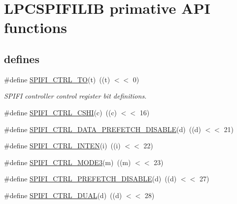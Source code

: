 \hypertarget{group___l_p_c_s_p_i_f_i_l_i_b___h_w___p_r_i_m}{}\section{L\+P\+C\+S\+P\+I\+F\+I\+L\+IB primative A\+PI functions}
\label{group___l_p_c_s_p_i_f_i_l_i_b___h_w___p_r_i_m}
\subsection*{\textquotesingle{}defines\textquotesingle{}}
\begin{DoxyCompactItemize}
\item 
\#define \hyperlink{group___l_p_c_s_p_i_f_i_l_i_b___h_w___p_r_i_m_ga96d43de9db048410b9d6d57de97a708d}{S\+P\+I\+F\+I\+\_\+\+C\+T\+R\+L\+\_\+\+TO}(t)~((t) $<$$<$ 0)
\begin{DoxyCompactList}\small\item\em S\+P\+I\+FI controller control register bit definitions. \end{DoxyCompactList}\item 
\#define \hyperlink{group___l_p_c_s_p_i_f_i_l_i_b___h_w___p_r_i_m_ga97562b0e2b41883d0f15e129f4b96cd7}{S\+P\+I\+F\+I\+\_\+\+C\+T\+R\+L\+\_\+\+C\+S\+HI}(c)~((c) $<$$<$ 16)
\item 
\#define \hyperlink{group___l_p_c_s_p_i_f_i_l_i_b___h_w___p_r_i_m_gaa87d14cdbb5575d56021c4fe68ec3d9f}{S\+P\+I\+F\+I\+\_\+\+C\+T\+R\+L\+\_\+\+D\+A\+T\+A\+\_\+\+P\+R\+E\+F\+E\+T\+C\+H\+\_\+\+D\+I\+S\+A\+B\+LE}(d)~((d) $<$$<$ 21)
\item 
\#define \hyperlink{group___l_p_c_s_p_i_f_i_l_i_b___h_w___p_r_i_m_ga3b934a3fc067d9b8676c6de1b4fe5f8f}{S\+P\+I\+F\+I\+\_\+\+C\+T\+R\+L\+\_\+\+I\+N\+T\+EN}(i)~((i) $<$$<$ 22)
\item 
\#define \hyperlink{group___l_p_c_s_p_i_f_i_l_i_b___h_w___p_r_i_m_ga9b92eaf07dc9eea3aed22b1e624965b2}{S\+P\+I\+F\+I\+\_\+\+C\+T\+R\+L\+\_\+\+M\+O\+D\+E3}(m)~((m) $<$$<$ 23)
\item 
\#define \hyperlink{group___l_p_c_s_p_i_f_i_l_i_b___h_w___p_r_i_m_gaba671674e51b96229b672241cefb237a}{S\+P\+I\+F\+I\+\_\+\+C\+T\+R\+L\+\_\+\+P\+R\+E\+F\+E\+T\+C\+H\+\_\+\+D\+I\+S\+A\+B\+LE}(d)~((d) $<$$<$ 27)
\item 
\#define \hyperlink{group___l_p_c_s_p_i_f_i_l_i_b___h_w___p_r_i_m_ga8d532e0a2c0eb178d12e6bddcb404258}{S\+P\+I\+F\+I\+\_\+\+C\+T\+R\+L\+\_\+\+D\+U\+AL}(d)~((d) $<$$<$ 28)
$$
\end{DoxyCompactItemize}

